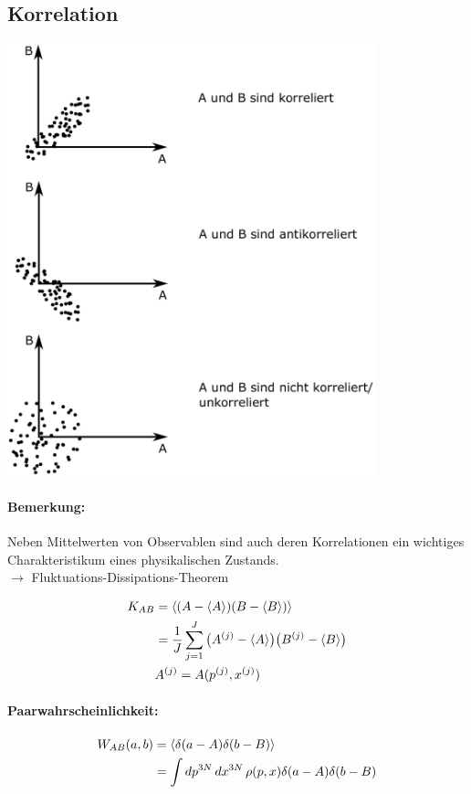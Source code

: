	\subsection{Korrelation}

\begin{center}
	\includegraphics[width=0.8\textwidth]{Abb/korrelation.pdf}
\end{center}

\paragraph{Bemerkung:} Neben Mittelwerten von Observablen sind auch deren
Korrelationen ein wichtiges Charakteristikum eines physikalischen Zustands.\\
$\rightarrow$ Fluktuations-Dissipations-Theorem

\begin{align*}
	K_{AB} &= \langle ( A - \langle A \rangle ) ( B - \langle B \rangle ) \rangle\\
		   &= \frac{1}{J} \sum_{j=1}^{J} \big( A^{(j)} - \langle A \rangle \big) \big( 
		      B^{(j)} - \langle B \rangle \big)\\
		   & A^{(j)} = A(p^{(j)}, x^{(j)})
\end{align*}

\paragraph{Paarwahrscheinlichkeit:} 
\begin{align*}
	W_{AB}(a,b) &= \langle  \delta ( a - A ) \delta ( b - B )  \rangle\\
				   &= \int dp^{3N} \, dx^{3N} \, \rho ( p , x ) \delta ( a - A ) \delta ( b - B )
\end{align*}


